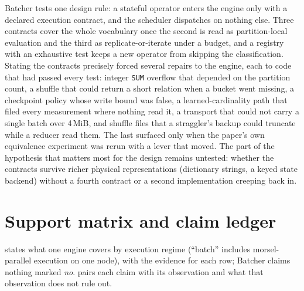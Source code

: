 \documentclass[10pt,twocolumn,letterpaper]{article}   %
\newcommand{\sys}{Batcher}
\begin{document}
\sys{} tests one design rule: a stateful operator enters the engine only with a declared
execution contract, and the scheduler dispatches on nothing else. Three contracts cover the
whole vocabulary once the second is read as partition-local evaluation and the third as
replicate-or-iterate under a budget, and a registry with an exhaustive test keeps a new operator
from skipping the classification. Stating the contracts precisely forced several repairs to the
engine, each to code that had passed every test: integer \texttt{SUM} overflow that depended
on the partition count, a shuffle that could return a short relation when a bucket went missing,
a checkpoint policy whose write bound was false, a learned-cardinality path that filed every
measurement where nothing read it, a transport that could not carry a single batch over 4\,MiB,
and shuffle files that a straggler's backup could truncate while a reducer read them. The last
surfaced only when the paper's own equivalence experiment was rerun with a lever that moved. The part of the hypothesis that matters most for the design remains untested:
whether the contracts survive richer physical representations (dictionary strings, a keyed state
backend) without a fourth contract or a second implementation creeping back in.

{\scriptsize
\setlength{\bibsep}{0pt plus 0.1ex}


}


\appendix
\small
\section{Support matrix and claim ledger}
\label{sec:appendix-matrix}\label{sec:appendix-claims}

 states what one engine covers by execution regime (``batch'' includes
morsel-parallel execution on one node), with the evidence for each row; \sys{} claims nothing
marked \emph{no}.  pairs each claim with its observation and what that
observation does not rule out.
\end{document}
